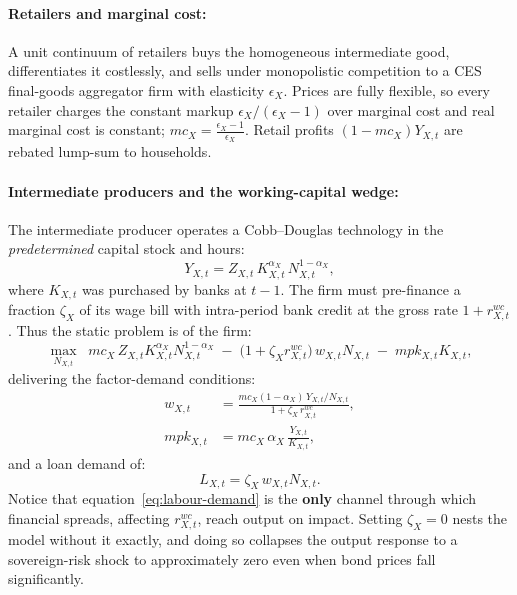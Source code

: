 \paragraph{Retailers and marginal cost:}
A unit continuum of retailers buys the homogeneous intermediate good, differentiates it costlessly, and sells under monopolistic competition to a CES final-goods aggregator firm with elasticity $\epsilon_X$. Prices are fully flexible, so every retailer
charges the constant markup $\epsilon_X/(\epsilon_X-1)$ over marginal cost and real
marginal cost is constant; $mc_X=\frac{\epsilon_X-1}{\epsilon_X}$\label{eq:mc}. Retail profits $(1-mc_X)Y_{X,t}$ are rebated lump-sum to households.

\paragraph{Intermediate producers and the working-capital wedge:}
\label{sec:wc}

The intermediate producer operates a Cobb--Douglas technology in the \emph{predetermined} capital stock and hours:
\begin{equation}
Y_{X,t}=Z_{X,t}\,K_{X,t}^{\alpha_X}\,N_{X,t}^{1-\alpha_X},
\label{eq:production}
\end{equation}
where $K_{X,t}$ was purchased by banks at $t-1$. The firm must pre-finance a fraction $\zeta_X$ of its wage bill with intra-period bank credit at the gross rate $1+r^{wc}_{X,t}$ \citep{neumeyer2005business}. Thus the static problem is of the firm:
\begin{equation}
\max_{N_{X,t}}\;\;
mc_X\,Z_{X,t}K_{X,t}^{\alpha_X}N_{X,t}^{1-\alpha_X}
\;-\;\bigl(1+\zeta_X r^{wc}_{X,t}\bigr)\,w_{X,t}N_{X,t}
\;-\;mpk_{X,t}K_{X,t},
\label{eq:firm-problem}
\end{equation}
delivering the factor-demand conditions: 
\begin{align}
w_{X,t}&=\frac{mc_X(1-\alpha_X)\,Y_{X,t}/N_{X,t}}{1+\zeta_X\,r^{wc}_{X,t}},
\label{eq:labour-demand}\\[3pt]
mpk_{X,t}&=mc_X\,\alpha_X\,\frac{Y_{X,t}}{K_{X,t}},
\label{eq:mpk}
\end{align}
and a loan demand of:
\begin{equation}
L_{X,t}=\zeta_X\,w_{X,t}N_{X,t}.
\label{eq:loan-demand}
\end{equation}
Notice that equation~\eqref{eq:labour-demand} is the \textbf{only} channel through which
financial spreads, affecting $r_{X,t}^{wc}$, reach output on impact. Setting $\zeta_X=0$ nests the model
without it exactly, and doing so collapses the output response to a sovereign-risk
shock to approximately zero even when bond prices fall significantly.

